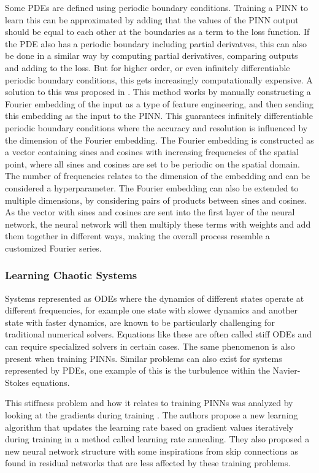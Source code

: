 Some PDEs are defined using periodic boundary conditions. Training a PINN to learn this can be approximated by adding that the values of the PINN output should be equal to each other at the boundaries as a term to the loss function. If the PDE also has a periodic boundary including partial derivatves, this can also be done in a similar way by computing partial derivatives, comparing outputs and adding to the loss. But for higher order, or even infinitely differentiable periodic boundary conditions, this gets increasingly computationally expensive. A solution to this was proposed in \cite{fourierembedding}. This method works by manually constructing a Fourier embedding of the input as a type of feature engineering, and then sending this embedding as the input to the PINN. This guarantees infinitely differentiable periodic boundary conditions where the accuracy and resolution is influenced by the dimension of the Fourier embedding. The Fourier embedding is constructed as a vector containing sines and cosines with increasing frequencies of the spatial point, where all sines and cosines are set to be periodic on the spatial domain. The number of frequencies relates to the dimension of the embedding and can be considered a hyperparameter. The Fourier embedding can also be extended to multiple dimensions, by considering pairs of products between sines and cosines. As the vector with sines and cosines are sent into the first layer of the neural network, the neural network will then multiply these terms with weights and add them together in different ways, making the overall process resemble a customized Fourier series.

\subsubsection{Learning Chaotic Systems}

Systems represented as ODEs where the dynamics of different states operate at different frequencies, for example one state with slower dynamics and another state with faster dynamics, are known to be particularly challenging for traditional numerical solvers. Equations like these are often called stiff ODEs and can require specialized solvers in certain cases. The same phenomenon is also present when training PINNs. Similar problems can also exist for systems represented by PDEs, one example of this is the turbulence within the Navier-Stokes equations.

This stiffness problem and how it relates to training PINNs was analyzed by looking at the gradients during training \cite{pinngradientpathology}. The authors propose a new learning algorithm that updates the learning rate based on gradient values iteratively during training in a method called learning rate annealing. They also proposed a new neural network structure with some inspirations from skip connections as found in residual networks \cite{resnet} that are less affected by these training problems.

